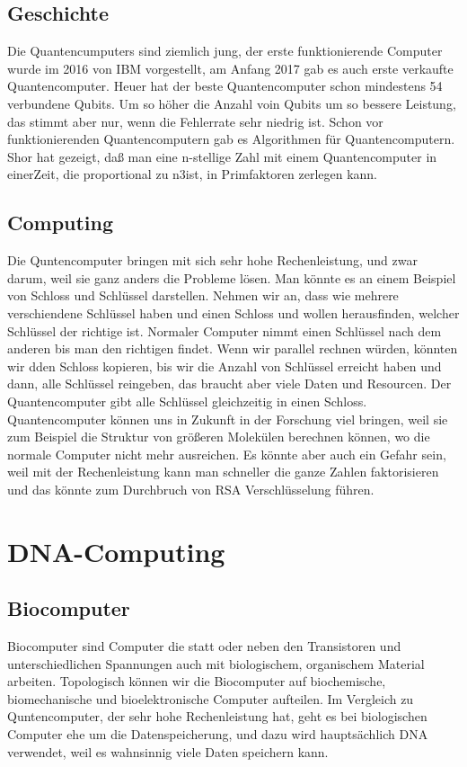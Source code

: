 \documentclass{IEEEcsmag}
\begin{document}
\subsection{Geschichte}
Die Quantencumputers sind ziemlich jung, der erste funktionierende Computer wurde im 2016 von IBM vorgestellt, am Anfang 2017 gab es auch erste verkaufte Quantencomputer. Heuer hat der beste Quantencomputer schon mindestens 54 verbundene Qubits. Um so höher die Anzahl voin Qubits um so bessere Leistung, das stimmt aber nur, wenn die Fehlerrate sehr niedrig ist. Schon vor funktionierenden Quantencomputern gab es Algorithmen für Quantencomputern. Shor hat gezeigt, daß man eine n-stellige Zahl mit einem Quantencomputer in einerZeit, die proportional zu n3ist, in Primfaktoren zerlegen kann.  \cite{AA2}

\subsection{Computing}
Die Quntencomputer bringen mit sich sehr hohe Rechenleistung, und zwar darum, weil sie ganz anders die Probleme lösen. Man könnte es an einem Beispiel von Schloss und Schlüssel darstellen. Nehmen wir an, dass wie mehrere verschiendene Schlüssel haben und einen Schloss und wollen herausfinden, welcher Schlüssel der richtige ist. Normaler Computer nimmt einen Schlüssel nach dem anderen bis man den richtigen findet. Wenn wir parallel rechnen würden, könnten wir dden Schloss kopieren, bis wir die Anzahl von Schlüssel erreicht haben und dann, alle Schlüssel reingeben, das braucht aber viele Daten und Resourcen. Der Quantencomputer gibt alle Schlüssel gleichzeitig in einen Schloss. Quantencomputer können uns in Zukunft in der Forschung viel bringen, weil sie zum Beispiel die Struktur von größeren Molekülen berechnen können, wo die normale Computer nicht mehr ausreichen. Es könnte aber auch ein Gefahr sein, weil mit der Rechenleistung kann man schneller die ganze Zahlen faktorisieren und das könnte zum Durchbruch von RSA Verschlüsselung führen.

\section{DNA-Computing}

\subsection{Biocomputer}
Biocomputer sind Computer die statt oder neben den Transistoren und unterschiedlichen Spannungen auch mit biologischem, organischem Material arbeiten. Topologisch können wir die Biocomputer auf biochemische, biomechanische und bioelektronische Computer aufteilen. Im Vergleich zu Quntencomputer, der sehr hohe Rechenleistung hat, geht es bei biologischen Computer ehe um die Datenspeicherung, und dazu wird hauptsächlich DNA verwendet, weil es wahnsinnig viele Daten speichern kann. 
\end{document}
